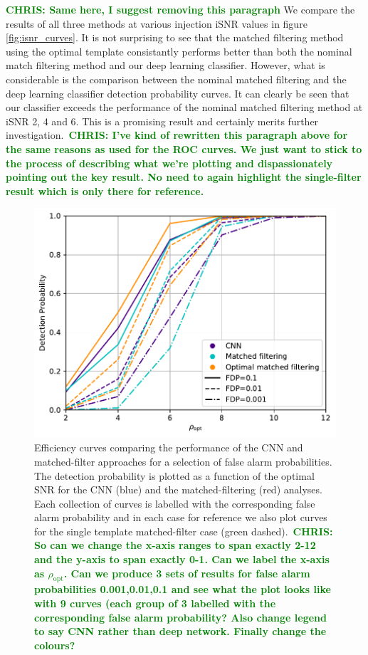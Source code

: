 \documentclass[%
 amsmath,amssymb,
 aps,
 twocolumn,
 prl,
 reprint,
floatfix,
]{revtex4-1}
\newcommand{\optsnr}{\rho_{\mathrm{opt}}}
\newcommand{\chris}[1]{\textbf{\textcolor{green}{CHRIS: #1}}}
\begin{document}
\chris{Same here, I suggest removing this paragraph} We compare the results of
all three methods at various injection iSNR values in figure
\ref{fig:isnr_curves}. It is not surprising to see that the matched filtering
method using the optimal template consistantly performs better than both the
nominal match filtering method and our deep learning classifier.  However, what
is considerable is the comparison between the nominal matched filtering and the
deep learning classifier detection probability curves. It can clearly be seen
that our classifier exceeds the performance of the nominal matched filtering
method at iSNR 2, 4 and 6. This is a promising result and certainly merits
further investigation.~\chris{I've kind of rewritten this paragraph above for
the same reasons as used for the ROC curves. We just want to stick to the
process of describing what we're plotting and dispassionately pointing out the
key result. No need to again highlight the single-filter result which is only
there for reference.}  

%
%
\begin{figure}[]
\includegraphics[width=\columnwidth] {figures/efficiency.pdf}
\caption{Efficiency curves comparing the performance of the \ac{CNN} and
matched-filter approaches for a selection of false alarm probabilities. The
detection probability is plotted as a function of the optimal \ac{SNR} for the 
\ac{CNN} (blue) and the matched-filtering (red) analyses. Each collection of
curves is labelled with the corresponding false alarm probability and in each
case for reference we also plot curves for the single template matched-filter
case (green dashed).~\chris{So can we change the x-axis ranges to span exactly 2-12
and the y-axis to span exactly 0-1. Can we label the x-axis as $\optsnr$. Can
we produce 3 sets of results for false alarm probabilities 0.001,0.01,0.1 and
see what the plot looks like with 9 curves (each group of 3 labelled with the
corresponding false alarm probability? Also change legend to say CNN rather
than deep network. Finally change the colours?}\label{fig:efficiency_curve}}
\end{figure}
\end{document}
